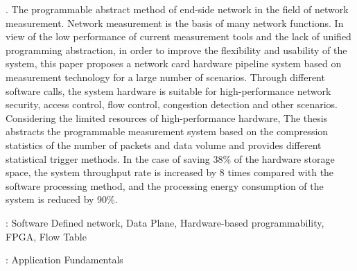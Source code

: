 . The programmable abstract method of end-side network in the field of network measurement.
Network measurement is the basis of many network functions. In view of the low performance of current measurement tools and the lack of unified programming abstraction, in order to improve the flexibility and usability of the system, this paper proposes a network card hardware pipeline system based on measurement technology for a large number of scenarios. Through different software calls, the system hardware is suitable for high-performance network security, access control, flow control, congestion detection and other scenarios.
Considering the limited resources of high-performance hardware,
The thesis abstracts the programmable measurement system based on the compression statistics of the number of packets and data volume and provides different statistical trigger methods.\newline
In the case of saving 38\% of the hardware storage space, the system throughput rate is increased by 8 times compared with the software processing method, and the processing energy consumption of the system is reduced by 90\%.


\vspace{\baselineskip}
: Software Defined network, Data Plane, Hardware-based programmability, FPGA, Flow Table



\vspace{\baselineskip}
: Application Fundamentals

\clearpage
